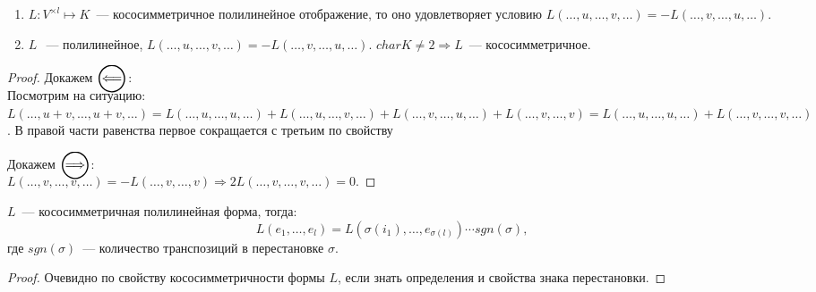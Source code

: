 \begin{statement}\leavevmode
    \begin{enumerate}
        \item
            $L: V^{\times l}\mapsto K$~--- кососимметричное полилинейное отображение, то
            оно удовлетворяет условию $L(\dots, u,\dots, v,\dots) = -L(\dots,v,\dots,u,\dots)$.
        \item 
            $L~$~--- полилинейное, $L(\dots, u,\dots,v,\dots) = -L(\dots, v,\dots, u,\dots)$.
            $char K \not= 2 \Rightarrow L$~--- кососимметричное.
    \end{enumerate}
\end{statement}
\begin{proof}\leavevmode
    Докажем $\ola$:\\
    Посмотрим на ситуацию: $L(\dots, u + v, \dots, u + v,\dots) = 
    L(\dots, u,\dots, u,\dots) + L(\dots, u, \dots, v,\dots) + 
    L(\dots, v,\dots,u,\dots)+L(\dots, v,\dots, v) = L(\dots, u,\dots, u,\dots) + 
    L(\dots, v,\dots, v,\dots)$. В правой
    части равенства первое сокращается с третьим по свойству

    Докажем $\ora $:\\
    $L(\dots, v,\dots,v,\dots) = -L(\dots,v,\dots,v) \Rightarrow 
    2L(\dots,v,\dots,v,\dots) = 0$.
\end{proof}
\begin{motivation}
\end{motivation}
\begin{statement}
    $L$~--- кососимметричная полилинейная форма, тогда:
    \[
        L(e_1,\dots, e_l) = L(\sigma(i_1),\dots, e_{\sigma(l)})\cdots sgn(\sigma),
    \]
    где $sgn(\sigma)$~--- количество транспозиций в перестановке $\sigma$.
\end{statement}
\begin{proof}
    Очевидно по свойству кососимметричности формы $L$, если знать 
    определения и свойства знака перестановки.
\end{proof}
